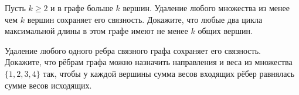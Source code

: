 \begin{problems}
\item Пусть $k\ge2$ и в графе больше $k$ вершин. Удаление любого множества из менее чем $k$ вершин сохраняет его связность. Докажите, что любые два цикла максимальной длины в этом графе имеют не менее $k$ общих вершин.

\item Удаление любого одного ребра связного графа сохраняет его связность. Докажите, что рёбрам графа можно назначить направления и веса из множества $\{1,2,3,4\}$ так, чтобы у каждой вершины сумма весов входящих рёбер равнялась сумме весов исходящих.

\end{problems}


